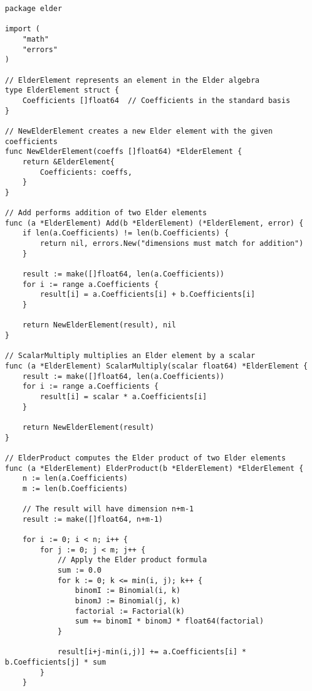 
\begin{lstlisting}[language=golang, caption={Implementation of Elder Algebra in GoLang}]
package elder

import (
    "math"
    "errors"
)

// ElderElement represents an element in the Elder algebra
type ElderElement struct {
    Coefficients []float64  // Coefficients in the standard basis
}

// NewElderElement creates a new Elder element with the given coefficients
func NewElderElement(coeffs []float64) *ElderElement {
    return &ElderElement{
        Coefficients: coeffs,
    }
}

// Add performs addition of two Elder elements
func (a *ElderElement) Add(b *ElderElement) (*ElderElement, error) {
    if len(a.Coefficients) != len(b.Coefficients) {
        return nil, errors.New("dimensions must match for addition")
    }
    
    result := make([]float64, len(a.Coefficients))
    for i := range a.Coefficients {
        result[i] = a.Coefficients[i] + b.Coefficients[i]
    }
    
    return NewElderElement(result), nil
}

// ScalarMultiply multiplies an Elder element by a scalar
func (a *ElderElement) ScalarMultiply(scalar float64) *ElderElement {
    result := make([]float64, len(a.Coefficients))
    for i := range a.Coefficients {
        result[i] = scalar * a.Coefficients[i]
    }
    
    return NewElderElement(result)
}

// ElderProduct computes the Elder product of two Elder elements
func (a *ElderElement) ElderProduct(b *ElderElement) *ElderElement {
    n := len(a.Coefficients)
    m := len(b.Coefficients)
    
    // The result will have dimension n+m-1
    result := make([]float64, n+m-1)
    
    for i := 0; i < n; i++ {
        for j := 0; j < m; j++ {
            // Apply the Elder product formula
            sum := 0.0
            for k := 0; k <= min(i, j); k++ {
                binomI := Binomial(i, k)
                binomJ := Binomial(j, k)
                factorial := Factorial(k)
                sum += binomI * binomJ * float64(factorial)
            }
            
            result[i+j-min(i,j)] += a.Coefficients[i] * b.Coefficients[j] * sum
        }
    }
    

\end{lstlisting}
